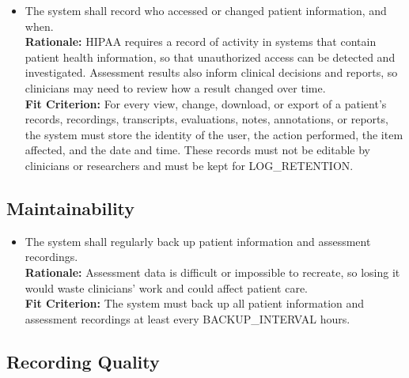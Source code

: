 \documentclass[12pt]{article}
\newcounter{nfrnum} %
\newcommand{\rthenfrnum}{NFR\thenfrnum}
\begin{document}
\begin{itemize}
\item[\textbf{\rthenfrnum}:]
\label{NFR-S4}
  The system shall record who accessed or changed patient information, and when.
  \\ \textbf{Rationale:} HIPAA requires a record of activity in systems that contain patient health information, so that unauthorized access can be detected and investigated. Assessment results also inform clinical decisions and reports, so clinicians may need to review how a result changed over time.
  \\ \textbf{Fit Criterion:} For every view, change, download, or export of a patient’s records, recordings, transcripts, evaluations, notes, annotations, or reports, the system must store the identity of the user, the action performed, the item affected, and the date and time. These records must not be editable by clinicians or researchers and must be kept for LOG\_RETENTION.

\end{itemize}

\subsection{Maintainability}

\noindent \begin{itemize}

\item[\textbf{\rthenfrnum}:]
\label{NFR-M1}
  The system shall regularly back up patient information and assessment recordings.
  \\ \textbf{Rationale:} Assessment data is difficult or impossible to recreate, so losing it would waste clinicians’ work and could affect patient care.
  \\ \textbf{Fit Criterion:} The system must back up all patient information and assessment recordings at least every BACKUP\_INTERVAL hours.

\end{itemize}

\subsection{Recording Quality}
\end{document}
